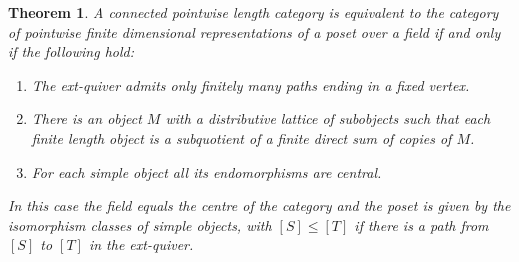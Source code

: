 \documentclass[a4paper]{amsart}
\theoremstyle{plain}
\newtheorem{thm}{Theorem}[section]
\theoremstyle{definition}
\theoremstyle{remark}
\numberwithin{equation}{section}
\begin{document}
\begin{thm}\label{th:main2}
  A connected pointwise length category is equivalent to the category
  of pointwise finite dimensional representations of a poset over a
  field if and only if the following hold:
  \begin{enumerate}
  \item[(L1)] The ext-quiver admits only finitely many paths ending in a fixed vertex. 
  \item[(L2)] There is an object $M$ with a distributive lattice of
    subobjects such that each  finite length object is a subquotient of a finite
    direct sum of copies of $M$.
  \item[(L3)] For each simple object all its endomorphisms are central. 
\end{enumerate}
In this case the field equals the centre of the category and the poset is
given by the isomorphism classes of simple objects, with $[S]\le [T]$
if there is a path from $[S]$ to $[T]$ in the ext-quiver.
\end{thm}
\end{document}
